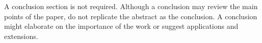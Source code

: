 A conclusion section is not required. Although a conclusion may review the main points of the paper, do not replicate the abstract as the conclusion. A conclusion might elaborate on the importance of the work or suggest applications and extensions. 